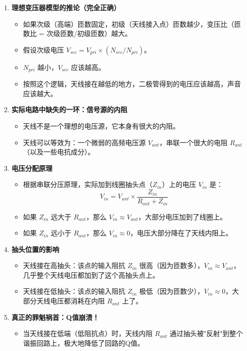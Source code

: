 \documentclass[12pt,UTF8]{ctexbook}
\begin{document}
\begin{enumerate}
	\item \textbf{理想变压器模型的推论（完全正确）}
	\begin{itemize}[leftmargin=3.5em]
		\item 如果次级（高端）匝数固定，初级（天线接入点）匝数越少，变压比（匝数比 = 次级匝数/初级匝数）越大。
		\item 假设次级电压 $V_{sec}=V_{pri}\times(N_{sec}/N_{pri})$。
		\item $N_{pri}$ 越小，$V_{sec}$ 应该越高。
		\item 按照这个逻辑，天线接在越低的地方，二极管得到的电压应该越高，声音应该越大。
	\end{itemize}
	\item \textbf{实际电路中缺失的一环：信号源的内阻}
	\begin{itemize}[leftmargin=3.5em]
		\item 天线不是一个理想的电压源，它本身有很大的内阻。
		\item 天线可以等效为：一个微弱的高频电压源 $V_{ant}$，串联一个很大的电阻 $R_{ant}$（以及一些电抗成分）。
	\end{itemize}
	\item \textbf{电压分配原理}
	\begin{itemize}[leftmargin=3.5em]
		\item 根据串联分压原理，实际加到线圈抽头点（$Z_{in}$）上的电压 $V_{in}$ 是：
		\[ V_{in}=V_{ant}\times\frac{Z_{in}}{R_{ant}+Z_{in}} \]
		\item 如果 $Z_{in}$ 远大于 $R_{ant}$，那么 $V_{in}\approx V_{ant}$，大部分电压加到了线圈上。
		\item 如果 $Z_{in}$ 远小于 $R_{ant}$，那么 $V_{in}\approx 0$，电压大部分降在了天线内阻上。
	\end{itemize}
	\item \textbf{抽头位置的影响}
	\begin{itemize}[leftmargin=3.5em]
		\item 天线接在高抽头：该点的输入阻抗 $Z_{in}$ 很高（因为匝数多），$V_{in}\approx V_{ant}$，几乎整个天线电压都加到了这个高抽头点上。
		\item 天线接在低抽头：该点的输入阻抗 $Z_{in}$ 极低（因为匝数少），$V_{in}\approx 0$，大部分天线电压都消耗在内阻 $R_{ant}$ 上了。
	\end{itemize}
	\item \textbf{真正的罪魁祸首：Q值崩溃！}
	\begin{itemize}[leftmargin=3.5em]
		\item 当天线接在低端（低阻抗点）时，天线内阻 $R_{ant}$ 通过抽头被"反射"到整个谐振回路上，极大地降低了回路的Q值。

\end{itemize}
\end{enumerate}
\end{document}
